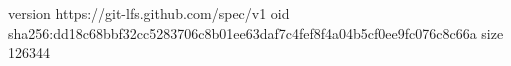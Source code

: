 version https://git-lfs.github.com/spec/v1
oid sha256:dd18c68bbf32cc5283706c8b01ee63daf7c4fef8f4a04b5cf0ee9fc076c8c66a
size 126344

